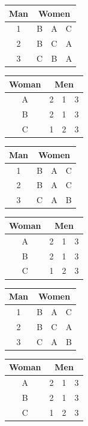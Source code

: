 \documentclass[11pt]{article}
\begin{document}
\begin{qunlist}
\begin{itemize}
{\begin{center}
\begin{tabular}{|c|ccc|}\hline 
Man&\multicolumn{3}{|c|}{Women}\\\hline 
1&B&A&C\\\hline 
2&B&C&A\\\hline 
3&C&B&A\\\hline
\end{tabular} 
\hspace{2cm}
\begin{tabular}{|c|ccc|}\hline 
Woman&\multicolumn{3}{|c|}{Men}\\\hline 
A&2&1&3\\\hline 
B&2&1&3\\\hline 
C&1&2&3\\\hline
\end{tabular}
\end{center}

\begin{center}
\begin{tabular}{|c|ccc|}\hline 
Man&\multicolumn{3}{|c|}{Women}\\\hline 
1&B&A&C\\\hline 
2&B&A&C\\\hline 
3&C&A&B\\\hline
\end{tabular} 
\hspace{2cm}
\begin{tabular}{|c|ccc|}\hline 
Woman&\multicolumn{3}{|c|}{Men}\\\hline 
A&2&1&3\\\hline 
B&2&1&3\\\hline 
C&1&2&3\\\hline
\end{tabular}
\end{center}

\begin{center}
\begin{tabular}{|c|ccc|}\hline 
Man&\multicolumn{3}{|c|}{Women}\\\hline 
1&B&A&C\\\hline 
2&B&C&A\\\hline 
3&C&A&B\\\hline
\end{tabular} 
\hspace{2cm}
\begin{tabular}{|c|ccc|}\hline 
Woman&\multicolumn{3}{|c|}{Men}\\\hline 
A&2&1&3\\\hline 
B&2&1&3\\\hline 
C&1&2&3\\\hline
\end{tabular}
\end{center}

}
\end{itemize}
\end{qunlist}
\end{document}
